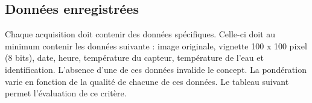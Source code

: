 

\subsection{Données enregistrées}
\label{s:cdc_pdd_donnees_enre}

Chaque acquisition doit contenir des données spécifiques. Celle-ci doit au minimum contenir les données suivante : image originale, vignette 100 x 100 pixel (8 bits), date, heure,  température du capteur, température de l’eau et identification. L’absence d’une de ces données invalide le concept. La pondération varie en fonction de la qualité de chacune de ces données. Le tableau suivant permet l’évaluation de ce critère.

\begin{table}[htp]


\end{table}
